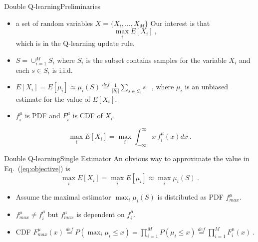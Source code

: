 \documentclass{beamer}
\newcommand{\red}[1]{{\color{red} #1}}
\begin{document}
\begin{frame}{Double Q-learning}{Preliminaries}
	\begin{itemize}
		\item a set of random variables $X = \{X_i, \ldots, X_M\}$
			Our interest is that
			\begin{equation}\label{eq:objective}
				\max_i E[X_i] ~,
			\end{equation}
			which is in the Q-learning update rule.
		\item $S = \cup_{i=1}^M S_i$ where $S_i$ is the subset contains samples for the variable $X_i$ and each $s \in S_i$ is i.i.d.
		\item $E[X_i] = E[\mu_i] \approx \mu_i(S) \overset{def}{=}\frac{1}{|S_i|}\sum_{s\in S_i}s$ ~, where $\mu_i$ is an unbiased estimate for the value of $E[X_i]$.
		\item $f_i^{\mu}$ is PDF and $F_i^{\mu}$ is CDF of $X_i$.
	\end{itemize}
	\begin{equation}\nonumber
		\max_i E[X_i] = \max_i \int_{-\infty}^{\infty} x ~f_i^{\mu}(x)dx ~.
	\end{equation}
\end{frame}

\begin{frame}{Double Q-learning}{Single Estimator}
An obvious way to approximate the value in Eq.~(\ref{eq:objective}) is
	\begin{equation}
		\max_i E[X_i] = \max_i E[\mu_i] \approx \max_i \mu_i(S) ~.
	\end{equation}
	\begin{itemize}
		\item Assume the maximal estimator \red{$\max_i \mu_i(S)$} is distributed as PDF $f_{max}^{\mu}$.
		\item $f_{max}^{\mu} \neq f_i^{\mu}$ but $f_{max}^{\mu}$ is dependent on $f_i^{\mu}$.
		\pause
		\item CDF $F_{max}^{\mu}(x) \overset{def}{=} P(\max_i \mu_i \leq x) = \prod_{i=1}^M P(\mu_i \leq x) \overset{def}{=} \prod_{i=1}^M F_i^{\mu}(x) ~.$
	\end{itemize}
\end{frame}
\end{document}
